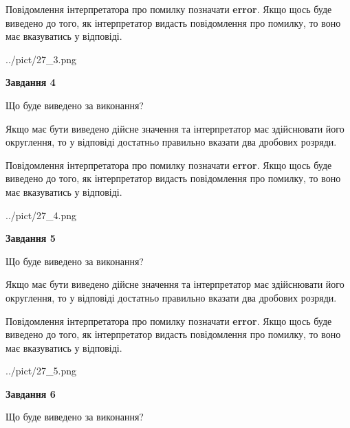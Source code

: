 \documentclass[12pt, ukrainian]{article}
\begin{document}
{\begin {Large}
Повідомлення інтерпретатора про помилку позначати \textbf{error}.
Якщо щось буде виведено до того, як інтерпретатор видасть повідомлення про помилку, 
то воно має вказуватись у відповіді. \par

\begin{center}
	{../pict/27_3.png}
\end{center}
\newpage

{\begin {center}\textbf{Завдання 4}\end {center}}\par
Що буде виведено за виконання? \par

Якщо має бути виведено дійсне значення та інтерпретатор має здійснювати його округлення, 
то у відповіді достатньо правильно вказати два дробових розряди.

Повідомлення інтерпретатора про помилку позначати \textbf{error}.
Якщо щось буде виведено до того, як інтерпретатор видасть повідомлення про помилку, 
то воно має вказуватись у відповіді. \par

\begin{center}
	{../pict/27_4.png}
\end{center}
\newpage

{\begin {center}\textbf{Завдання 5}\end {center}}\par
Що буде виведено за виконання? \par

Якщо має бути виведено дійсне значення та інтерпретатор має здійснювати його округлення, 
то у відповіді достатньо правильно вказати два дробових розряди.

Повідомлення інтерпретатора про помилку позначати \textbf{error}.
Якщо щось буде виведено до того, як інтерпретатор видасть повідомлення про помилку, 
то воно має вказуватись у відповіді. \par

\begin{center}
	{../pict/27_5.png}
\end{center}
\newpage

{\begin {center}\textbf{Завдання 6}\end {center}}\par
Що буде виведено за виконання? \par


\end{Large}}
\end{document}

